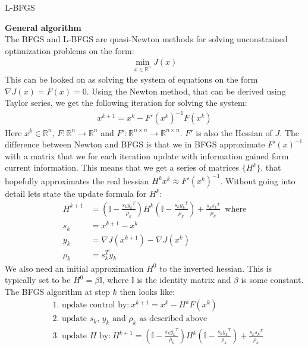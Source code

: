 \documentclass[11pt,a4paper]{report}
\begin{document}
\begin{center}

\LARGE L-BFGS


\end{center}
\textbf{General algorithm}
\\
The BFGS and L-BFGS are quasi-Newton methods for solving unconstrained optimization problems on the form:
\begin{align*}
\min_{x \in \mathbb{R}^n} J(x)
\end{align*} 
This can be looked on as solving the system of equations on the form \\$\nabla J(x) = F(x)=0$. Using the Newton method, that can be derived using Taylor series, we get the following iteration for solving the system:
\begin{align*}
x^{k+1} = x^k - F'(x^k)^{-1}F(x^k)
\end{align*}
Here $x^k \in \mathbb{R}^n$, $F:\mathbb{R}^n \rightarrow \mathbb{R}^n$ and $F':\mathbb{R}^{n\times n} \rightarrow \mathbb{R}^{n\times n}$. $F'$ is also the Hessian of $J$. The difference between Newton and BFGS is that we in BFGS approximate $F'(x)^{-1}$ with a matrix that we for each iteration update with information gained form current information. This means that we get a series of matrices $\{H^k\}$, that hopefully approximates the real hessian $H^kx^k \approx F'(x^k)^{-1}$. Without going into detail lets state the update formula for $H^k$:
\begin{align*}
H^{k+1} &= (\mathbb{I} - \frac{s_k {y_k}^T}{\rho_k})H^k(\mathbb{I} - \frac{s_k {y_k}^T}{\rho_k}) + \frac{s_k {s_k}^T}{\rho_k} \ \text{ where} \\
s_k &= x^{k+1} - x^k \\
y_k &= \nabla J(x^{k+1}) - \nabla J(x^k) \\
\rho_k &= s_k^Ty_k
\end{align*} 
We also need an initial approximation $H^0$ to the inverted hessian. This is typically set to be $H^0 = \beta\mathbb{I}$, where $\mathbb{I}$ is the identity matrix and $\beta$ is some constant. The BFGS algorithm at step $k$ then looks like:
\begin{align*}
&\text{1. update control by:} \ x^{k+1}= x^{k} - H^kF(x^{k}) \\
&\text{2. update $s_k$, $y_k$ and $\rho_k$ as described above} \\
&\text{3. update $H$ by:} \ H^{k+1} = (\mathbb{I} - \frac{s_k {y_k}^T}{\rho_k})H^k(\mathbb{I} - \frac{s_k {y_k}^T}{\rho_k}) + \frac{s_k {s_k}^T}{\rho_k}
\end{align*}
\end{document}
